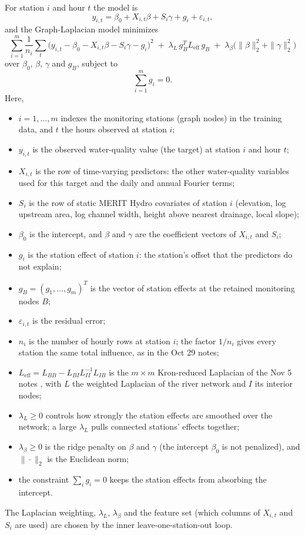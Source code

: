 \documentclass[12pt]{article}
\begin{document}
For station $i$ and hour $t$ the model is
\[
  y_{i,t} = \beta_0 + X_{i,t}\beta + S_i\gamma + g_i + \varepsilon_{i,t},
\]
and the Graph-Laplacian model minimizes
\[
  \boxed{\;\sum_{i=1}^{m} \frac{1}{n_i} \sum_{t} \bigl(y_{i,t} - \beta_0 - X_{i,t}\beta - S_i\gamma - g_i\bigr)^2
  \;+\; \lambda_L\, g_B^{T} L_{\text{eff}}\, g_B \;+\; \lambda_\beta \bigl(\|\beta\|_2^2 + \|\gamma\|_2^2\bigr)\;}
\]
over $\beta_0$, $\beta$, $\gamma$ and $g_B$, subject to
\[
  \sum_{i=1}^{m} g_i = 0.
\]
Here,
\begin{itemize}
  \item $i = 1, \dots, m$ indexes the monitoring stations (graph nodes) in the training data, and
        $t$ the hours observed at station $i$;
  \item $y_{i,t}$ is the observed water-quality value (the target) at station $i$ and hour $t$;
  \item $X_{i,t}$ is the row of time-varying predictors: the other water-quality variables used
        for this target and the daily and annual Fourier terms;
  \item $S_i$ is the row of static MERIT Hydro covariates of station $i$ (elevation, log upstream
        area, log channel width, height above nearest drainage, local slope);
  \item $\beta_0$ is the intercept, and $\beta$ and $\gamma$ are the coefficient vectors of
        $X_{i,t}$ and $S_i$;
  \item $g_i$ is the station effect of station $i$: the station's offset that the predictors do not
        explain;
  \item $g_B = (g_1, \dots, g_m)^{T}$ is the vector of station effects at the retained monitoring
        nodes $B$;
  \item $\varepsilon_{i,t}$ is the residual error;
  \item $n_i$ is the number of hourly rows at station $i$; the factor $1/n_i$ gives every station
        the same total influence, as in the Oct 29 notes;
  \item $L_{\text{eff}} = L_{BB} - L_{BI} L_{II}^{-1} L_{IB}$ is the $m \times m$ Kron-reduced
        Laplacian of the Nov 5 notes \cite{dorfler}, with $L$ the weighted Laplacian of the river
        network and $I$ its interior nodes;
  \item $\lambda_L \ge 0$ controls how strongly the station effects are smoothed over the network;
        a large $\lambda_L$ pulls connected stations' effects together;
  \item $\lambda_\beta \ge 0$ is the ridge penalty on $\beta$ and $\gamma$ (the intercept $\beta_0$
        is not penalized), and $\|\cdot\|_2$ is the Euclidean norm;
  \item the constraint $\sum_i g_i = 0$ keeps the station effects from absorbing the intercept.
\end{itemize}
The Laplacian weighting, $\lambda_L$, $\lambda_\beta$ and the feature set (which columns of
$X_{i,t}$ and $S_i$ are used) are chosen by the inner leave-one-station-out loop.
\end{document}

